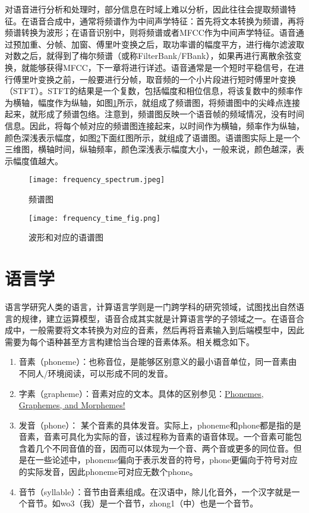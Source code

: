\documentclass[cn,10pt,math=newtx,citestyle=gb7714-2015,bibstyle=gb7714-2015]{elegantbook}
\begin{document}
对语音进行分析和处理时，部分信息在时域上难以分析，因此往往会提取频谱特征。在语音合成中，通常将频谱作为中间声学特征：首先将文本转换为频谱，再将频谱转换为波形；在语音识别中，则将频谱或者MFCC作为中间声学特征。语音通过预加重、分帧、加窗、傅里叶变换之后，取功率谱的幅度平方，进行梅尔滤波取对数之后，就得到了梅尔频谱（或称FilterBank/FBank），如果再进行离散余弦变换，就能够获得MFCC，下一章将进行详述。语音通常是一个短时平稳信号，在进行傅里叶变换之前，一般要进行分帧，取音频的一个小片段进行短时傅里叶变换（STFT）。STFT的结果是一个复数，包括幅度和相位信息，将该复数中的频率作为横轴，幅度作为纵轴，如图\ref{fig:frequency_spectrum}所示，就组成了频谱图，将频谱图中的尖峰点连接起来，就形成了频谱包络。注意到，频谱图反映一个语音帧的频域情况，没有时间信息。因此，将每个帧对应的频谱图连接起来，以时间作为横轴，频率作为纵轴，颜色深浅表示幅度，如图\ref{fig:frequency_time_fig}下面红图所示，就组成了语谱图。语谱图实际上是一个三维图，横轴时间，纵轴频率，颜色深浅表示幅度大小，一般来说，颜色越深，表示幅度值越大。

\begin{figure}[htbp]
  \centering
  \texttt{[image: frequency\_spectrum.jpeg]}
  \caption{频谱图 \label{fig:frequency_spectrum}}
\end{figure}

\begin{figure}[htbp]
  \centering
  \texttt{[image: frequency\_time\_fig.png]}
  \caption{波形和对应的语谱图 \label{fig:frequency_time_fig}}
\end{figure}

\section{语言学}

语言学研究人类的语言，计算语言学则是一门跨学科的研究领域，试图找出自然语言的规律，建立运算模型，语音合成其实就是计算语言学的子领域之一。在语音合成中，一般需要将文本转换为对应的音素，然后再将音素输入到后端模型中，因此需要为每个语种甚至方言构建恰当合理的音素体系。相关概念如下。

\begin{enumerate}
  \item 音素（phoneme）：也称音位，是能够区别意义的最小语音单位，同一音素由不同人/环境阅读，可以形成不同的发音。
  \item 字素（grapheme）：音素对应的文本。具体的区别参见：\href{https://www.youtube.com/watch?v=25r1fyoorko}{Phonemes, Graphemes, and Morphemes!}
  \item 发音（phone）： 某个音素的具体发音。实际上，phoneme和phone都是指的是音素，音素可具化为实际的音，该过程称为音素的语音体现。一个音素可能包含着几个不同音值的音，因而可以体现为一个音、两个音或更多的同位音。但是在一些论述中，phoneme偏向于表示发音的符号，phone更偏向于符号对应的实际发音，因此phoneme可对应无数个phone。
  \item 音节（syllable）：音节由音素组成。在汉语中，除儿化音外，一个汉字就是一个音节。如wo3（我）是一个音节，zhong1（中）也是一个音节。
\end{enumerate}
\end{document}
